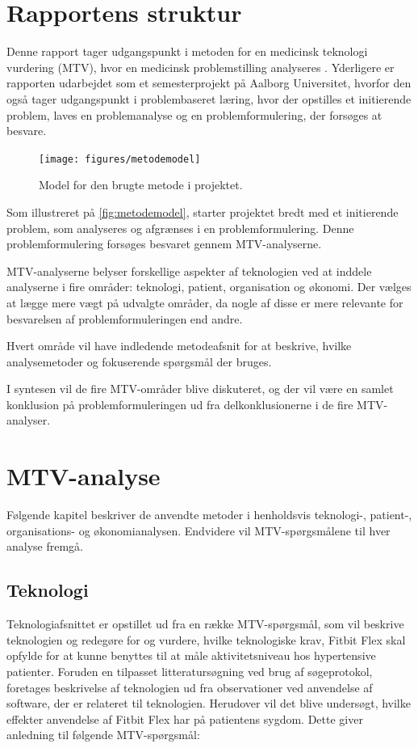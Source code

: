 \chapter{Rapportens struktur} \label{metode}
Denne rapport tager udgangspunkt i metoden for en medicinsk teknologi vurdering (MTV), hvor en medicinsk problemstilling analyseres \citep{mtvhaandbog}. Yderligere er rapporten udarbejdet som et semesterprojekt på Aalborg Universitet, hvorfor den også tager udgangspunkt i problembaseret læring, hvor der opstilles et initierende problem, laves en problemanalyse og en problemformulering, der forsøges at besvare. 


\begin{figure}[H]
	\centering
	\texttt{[image: figures/metodemodel]}
	\caption{Model for den brugte metode i projektet.}
	\label{fig:metodemodel}
\end{figure}

\noindent
Som illustreret på \autoref{fig:metodemodel}, starter projektet bredt med et initierende problem, som analyseres og afgrænses i en problemformulering. Denne problemformulering forsøges besvaret gennem MTV-analyserne. 

MTV-analyserne belyser forskellige aspekter af teknologien ved at inddele analyserne i fire områder: teknologi, patient, organisation og økonomi. Der vælges at lægge mere vægt på udvalgte områder, da nogle af disse er mere relevante for besvarelsen af problemformuleringen end andre. 

Hvert område vil have indledende metodeafsnit for at beskrive, hvilke analysemetoder og fokuserende spørgsmål der bruges. 

I syntesen vil de fire MTV-områder blive diskuteret, og der vil være en samlet konklusion på problemformuleringen ud fra delkonklusionerne i de fire MTV-analyser. 

\chapter{MTV-analyse}
Følgende kapitel beskriver de anvendte metoder i henholdsvis teknologi-, patient-, organisations- og økonomianalysen. Endvidere vil MTV-spørgsmålene til hver analyse fremgå. 

\section{Teknologi}\label{sec:metode_tek}
Teknologiafsnittet er opstillet ud fra en række MTV-spørgsmål, som vil beskrive teknologien og redegøre for og vurdere, hvilke teknologiske krav, Fitbit Flex skal opfylde for at kunne benyttes til at måle aktivitetsniveau hos hypertensive patienter. 
Foruden en tilpasset litteratursøgning ved brug af søgeprotokol, foretages beskrivelse af teknologien ud fra observationer ved anvendelse af software, der er relateret til teknologien.   
Herudover vil det blive undersøgt, hvilke effekter anvendelse af Fitbit Flex har på patientens sygdom. 
Dette giver anledning til følgende MTV-spørgsmål: 
